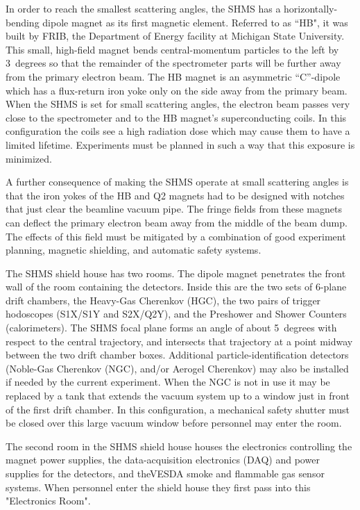 In order to reach the smallest scattering angles, the SHMS has a horizontally-bending dipole
magnet as its first magnetic element. Referred to as ``HB", it was built by FRIB, the Department of Energy
facility at Michigan State  University. This small, high-field magnet bends
central-momentum particles to the left by 3~degrees so that the remainder of the
spectrometer parts will be further away from the primary electron beam. The HB
magnet is an asymmetric ``C''-dipole which has a flux-return iron yoke only on
the side away from the primary beam. When the SHMS is set for small scattering
angles, the electron beam passes very close to the spectrometer and to the
HB magnet's superconducting
coils. In this configuration the coils see a high radiation
dose \cite{tn:waidyawansa15} which may cause
them to have a limited
lifetime. Experiments must be planned in such a way that this exposure is minimized.

A further consequence of making the SHMS operate at small scattering angles is
that the iron yokes of the HB and Q2 magnets had to be designed with notches
that just clear the beamline vacuum pipe. The fringe fields from these magnets can
deflect the primary electron beam away from the middle of the beam dump.
The effects of this field
must be mitigated by a combination of good experiment planning, magnetic shielding,
and automatic safety systems.

The SHMS shield house has two rooms. The dipole magnet penetrates the front
wall of the room containing the detectors. Inside this are the two sets of 6-plane
drift chambers, the Heavy-Gas Cherenkov (HGC), the two pairs of trigger hodoscopes
(S1X/S1Y and S2X/Q2Y), and
the Preshower and Shower Counters (calorimeters). The SHMS focal plane forms an
angle of about 5~degrees with respect to the central trajectory,
and intersects that trajectory at
a point midway between the two drift chamber boxes. Additional  particle-identification
detectors (Noble-Gas Cherenkov (NGC), and/or Aerogel Cherenkov) may also be
installed if needed by the current experiment. When the NGC is not in use it may
be replaced by a tank that extends the vacuum system up  to a window just in
front of the first drift chamber. In this configuration, a mechanical safety shutter
must be closed over this large vacuum window before personnel may enter the
room.

The second room in the SHMS shield house houses the
electronics controlling the magnet power supplies, the data-acquisition
electronics (DAQ) and power supplies for the detectors, and theVESDA
smoke and flammable gas sensor systems. When personnel enter the shield
house they first pass into this "Electronics Room".

